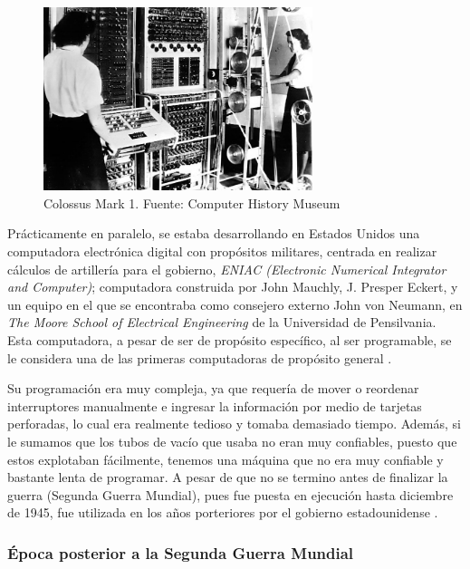 \documentclass[letterpaper,12pt,oneside]{book}
\begin{document}
		\begin{figure}
		    \centering
		    \includegraphics[width=0.7\textwidth]{media/Historia/CHM_computers_1944.colossus.jpg}
		    \caption{Colossus Mark 1. Fuente: Computer History Museum}
	    	\label{fig:colossus}
		\end{figure}
		
		Prácticamente en paralelo, se estaba desarrollando
		en Estados Unidos una computadora electrónica digital con propósitos militares, centrada en realizar cálculos de artillería para el gobierno,
		\textit{ENIAC (Electronic Numerical Integrator and Computer)}; computadora construida por John Mauchly, J. Presper Eckert, y un equipo en
		el que se encontraba como consejero externo John von Neumann, en
		\textit{The Moore School of Electrical Engineering} de la Universidad de Pensilvania. Esta computadora, a pesar de ser de propósito específico,
		al ser programable, se le considera una de las primeras computadoras de propósito general \cite{ifrah_universal_2001}. 
  
        Su programación era muy compleja, ya que requería de mover o reordenar
		interruptores manualmente e ingresar la información por medio de tarjetas perforadas, 
		lo cual era realmente tedioso y tomaba demasiado tiempo. Además, si le sumamos que  los tubos de vacío que usaba no eran muy confiables, puesto que 
		estos explotaban 	
		fácilmente, tenemos una máquina que no era muy confiable y  bastante lenta de programar. A pesar de que no se termino antes de finalizar la 
		guerra (Segunda Guerra Mundial), pues fue puesta en ejecución hasta diciembre de 1945, fue utilizada en los años 
		porteriores por el gobierno estadounidense \cite{ifrah_universal_2001}.
		
        \subsubsection{Época posterior a la Segunda Guerra Mundial}
		
\end{document}
